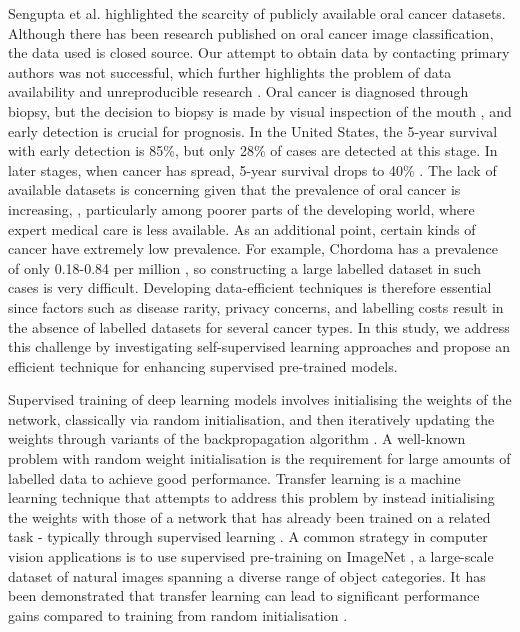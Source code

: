 \documentclass[a4paper,fleqn]{cas-dc}
\begin{document}
Sengupta et al. \cite{sengupta2022scarcity} highlighted the scarcity of publicly available oral cancer datasets. Although there has been research published on oral cancer image classification, the data used is closed source. Our attempt to obtain data by contacting primary authors was not successful, which further highlights the problem of data availability and unreproducible research \cite{jarvis2016irreproducibility,shiffrin2018scientific}. Oral cancer is diagnosed through biopsy, but the decision to biopsy is made by visual inspection of the mouth \cite{baykul2010early}, and early detection is crucial for prognosis. In the United States, the 5-year survival with early detection is 85\%, but only 28\% of cases are detected at this stage. In later stages, when cancer has spread, 5-year survival drops to 40\% \cite{cancer_net_2022}. The lack of available datasets is concerning given that the prevalence of oral cancer is increasing, \cite{warnakulasuriya2009global}, particularly among poorer parts of the developing world, where expert medical care is less available. As an additional point, certain kinds of cancer have extremely low prevalence. For example, Chordoma has a prevalence of only 0.18-0.84 per million \cite{Bakker2018}, so constructing a large labelled dataset in such cases is very difficult.  Developing data-efficient techniques is therefore essential since factors such as disease rarity, privacy concerns, and labelling costs result in the absence of labelled datasets for several cancer types. In this study, we address this challenge by investigating self-supervised learning approaches and propose an efficient technique for enhancing supervised pre-trained models.

Supervised training of deep learning models involves initialising the weights of the network, classically via random initialisation, and then iteratively updating the weights through variants of the backpropagation algorithm \cite{goodfellow2016deep}. A  well-known problem with random weight initialisation is the requirement for large amounts of labelled data to achieve good performance. Transfer learning is a machine learning technique that attempts to address this problem by instead initialising the weights with those of a network that has already been trained on a related task - typically through supervised learning \cite{zhuang2020comprehensive}. A common strategy in computer vision applications is to use supervised pre-training on ImageNet \cite{zhuang2020comprehensive}, a large-scale dataset of natural images spanning a diverse range of object categories. It has been demonstrated that transfer learning can lead to significant performance gains compared to training from random initialisation \cite{tan2018survey}.
\end{document}
